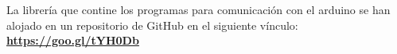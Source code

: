 La librería que contine los programas para comunicación con el arduino
se han alojado en un repositorio de GitHub en el siguiente vínculo:
\\
\hspace*{\fill}\href{https://goo.gl/tYH0Db}{\textbf{https://goo.gl/tYH0Db}}\hspace*{\fill}\\




    

    
